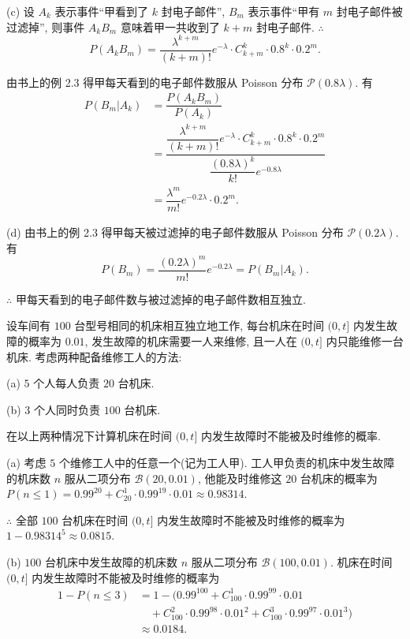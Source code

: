 \documentclass[color=black,device=normal,lang=cn]{elegantnote}
\numberwithin{equation}{section}
\theoremstyle{plain}
\numberwithin{exercise}{exsection}
\begin{document}
\begin{solution}
    (c) 设 $A_k$ 表示事件``甲看到了 $k$ 封电子邮件'',  $B_m$ 表示事件``甲有 $m$ 封电子邮件被过滤掉'', 则事件 $A_kB_m$ 意味着甲一共收到了 $k+m$ 封电子邮件. $\therefore$
    \[P(A_kB_m)=\dfrac{\lambda^{k+m}}{(k+m)!}e^{-\lambda}\cdot C_{k+m}^k\cdot0.8^k\cdot0.2^m.\]

    由书上的例 2.3 得甲每天看到的电子邮件数服从 Poisson 分布 $\mathcal{P}(0.8\lambda)$. 有
    \begin{align*}
        P(B_m|A_k) & =\dfrac{P(A_kB_m)}{P(A_k)} \\
        & =\dfrac{\dfrac{\lambda^{k+m}}{(k+m)!}e^{-\lambda}\cdot C_{k+m}^k\cdot0.8^k\cdot0.2^m}{\dfrac{(0.8\lambda)^k}{k!}e^{-0.8\lambda}} \\
        & =\dfrac{\lambda^m}{m!}e^{-0.2\lambda}\cdot0.2^m.
    \end{align*}

    (d) 由书上的例 2.3 得甲每天被过滤掉的电子邮件数服从 Poisson 分布 $\mathcal{P}(0.2\lambda)$. 有
    \[P(B_m)=\dfrac{(0.2\lambda)^m}{m!}e^{-0.2\lambda}=P(B_m|A_k).\]

    $\therefore$ 甲每天看到的电子邮件数与被过滤掉的电子邮件数相互独立.
\end{solution}
\begin{exercise}%
    设车间有 $100$ 台型号相同的机床相互独立地工作, 每台机床在时间 $(0,t]$ 内发生故障的概率为 $0.01$, 发生故障的机床需要一人来维修, 且一人在 $(0,t]$ 内只能维修一台机床. 考虑两种配备维修工人的方法:

    (a) $5$ 个人每人负责 $20$ 台机床.
    
    (b) $3$ 个人同时负责 $100$ 台机床.

    在以上两种情况下计算机床在时间 $(0,t]$ 内发生故障时不能被及时维修的概率.
\end{exercise}
\begin{solution}
    (a) 考虑 $5$ 个维修工人中的任意一个(记为工人甲). 工人甲负责的机床中发生故障的机床数 $n$ 服从二项分布 $\mathcal{B}(20,0.01)$, 他能及时维修这 $20$ 台机床的概率为 $P(n\leq1)=0.99^{20}+C_{20}^1\cdot0.99^{19}\cdot0.01\approx0.98314$.

    $\therefore$ 全部 $100$ 台机床在时间 $(0,t]$ 内发生故障时不能被及时维修的概率为 $1-0.98314^5\approx0.0815$.

    (b) $100$ 台机床中发生故障的机床数 $n$ 服从二项分布 $\mathcal{B}(100,0.01)$. 机床在时间 $(0,t]$ 内发生故障时不能被及时维修的概率为
    \begin{align*}
        1-P(n\leq 3) & =1-(0.99^{100}+C_{100}^1\cdot0.99^{99}\cdot0.01 \\
        & \quad+C_{100}^2\cdot0.99^{98}\cdot0.01^2+C_{100}^3\cdot0.99^{97}\cdot0.01^3) \\
        & \approx0.0184.
    \end{align*}
\end{solution}
\end{document}
